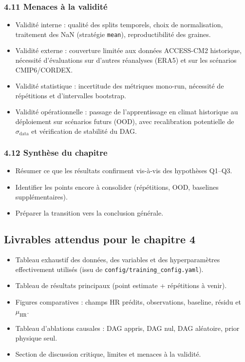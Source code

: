 \documentclass[12pt,a4paper]{article}
\begin{document}
\subsubsection*{4.11 Menaces \`a la validit\'e}
\begin{itemize}
    \item Validit\'e interne : qualit\'e des splits temporels, choix de normalisation, traitement des NaN (strat\'egie \texttt{mean}), reproductibilit\'e des graines.
    \item Validit\'e externe : couverture limit\'ee aux donn\'ees ACCESS-CM2 historique, n\'ecessit\'e d'\'evaluations sur d'autres r\'eanalyses (ERA5) et sur les sc\'enarios CMIP6/CORDEX.
    \item Validit\'e statistique : incertitude des m\'etriques mono-run, n\'ecessit\'e de r\'ep\'etitions et d'intervalles bootstrap.
    \item Validit\'e op\'erationnelle : passage de l'apprentissage en climat historique au d\'eploiement sur sc\'enarios futurs (OOD), avec recalibration potentielle de $\sigma_{\text{data}}$ et v\'erification de stabilit\'e du DAG.
\end{itemize}

\subsubsection*{4.12 Synth\`ese du chapitre}
\begin{itemize}
    \item R\'esumer ce que les r\'esultats confirment vis-\`a-vis des hypoth\`eses Q1--Q3.
    \item Identifier les points encore \`a consolider (r\'ep\'etitions, OOD, baselines suppl\'ementaires).
    \item Pr\'eparer la transition vers la conclusion g\'en\'erale.
\end{itemize}

\subsection*{Livrables attendus pour le chapitre 4}
\begin{itemize}
    \item Tableau exhaustif des donn\'ees, des variables et des hyperparam\`etres effectivement utilis\'es (issu de \texttt{config/training\_config.yaml}).
    \item Tableau de r\'esultats principaux (point estimate + r\'ep\'etitions \`a venir).
    \item Figures comparatives : champs HR pr\'edits, observations, baseline, r\'esidu et $\mu_{\mathrm{HR}}$.
    \item Tableau d'ablations causales : DAG appris, DAG nul, DAG al\'eatoire, prior physique seul.
    \item Section de discussion critique, limites et menaces \`a la validit\'e.
\end{itemize}
\end{document}
